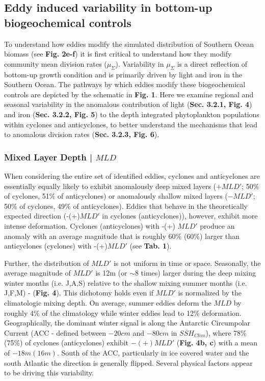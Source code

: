 
\subsection{Eddy induced variability in bottom-up biogeochemical controls}

To understand how eddies modify the simulated distribution of Southern Ocean biomass (see \textbf{Fig. 2e-f}) it is first critical to understand how they modify community mean division rates ($\mu_\Sigma$). Variability in $\mu_\Sigma$ is a direct reflection of bottom-up growth condition and is primarily driven by light \parencite{Fauchereauresponsephytoplanktonbiomass2011} and iron \parencite{BoydEnvironmentalFactorsControlling2002} in the Southern Ocean. The pathways by which eddies modify these biogeochemical controls are depicted by the schematic in \textbf{Fig. 1}. Here we examine regional and seasonal variability in the anomalous contribution of light (\textbf{Sec. 3.2.1, Fig. 4}) and iron (\textbf{Sec. 3.2.2, Fig. 5}) to the depth integrated phytoplankton populations within cyclones and anticyclones, to better understand the mechanisms that lead to anomalous division rates (\textbf{Sec. 3.2.3, Fig.  6}). 


\subsubsection{Mixed Layer Depth | $MLD$}

When considering the entire set of identified eddies, cyclones and anticyclones are essentially equally likely to exhibit anomalously deep mixed layers ($+ MLD'$; 50\% of cyclones, 51\% of anticyclones) or anomalously shallow mixed layers ($- MLD'$; 50\% of cyclones, 49\% of anticyclones). Eddies that behave in the theoretically expected direction (-(+)$MLD'$ in cyclones (anticyclones)), however, exhibit more intense deformation. Cyclones (anticyclones) with -(+) $MLD'$ produce an anomaly with an average magnitude that is roughly 60\% (60\%) larger than anticyclones (cyclones) with -(+)$MLD'$ (see \textbf{Tab. 1}).

Further, the distribution of $MLD'$ is not uniform in time or space. Seasonally, the average magnitude of $MLD'$ is 12m (or $\sim8$ times) larger during the deep mixing winter months (i.e. J,A,S) relative to the shallow mixing summer months (i.e. J,F,M) - (\textbf{Fig. 4}). This dichotomy holds even if $MLD'$ is normalized by the climatologic mixing depth. On average, summer eddies deform the $MLD$ by roughly 4\% of the climatology while winter eddies lead to 12\% deformation. Geographically, the dominant winter signal is along the Antarctic Circumpolar Current (ACC - defined between $-20cm$ and $-80cm$ in $\overline{SSH}_{Clim}$), where 78\% (75\%) of cyclones (anticyclones) exhibit $-(+)MLD'$  (\textbf{Fig. 4b, c}) with a mean of $-18m (16m)$. South of the ACC, particularly in ice covered water and the south Atlantic the direction is generally flipped. Several physical factors appear to be driving this variability.

